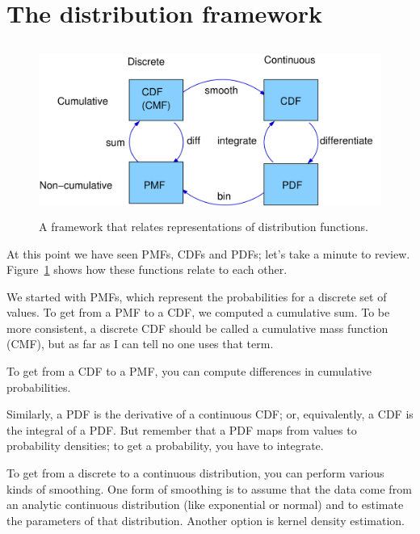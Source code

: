 \documentclass[12pt]{book}
\begin{document}
\section{The distribution framework}

\begin{figure}
\centerline{\includegraphics[height=2.2in]{figs/distribution_functions.pdf}}
\caption{A framework that relates representations of distribution
functions.}
\label{dist_framework}
\end{figure}

At this point we have seen PMFs, CDFs and PDFs; let's take a minute
to review.  Figure~\ref{dist_framework} shows how these functions relate
to each other.

We started with PMFs, which represent the probabilities for a discrete
set of values.  To get from a PMF to a CDF, we computed a cumulative sum.
To be more consistent, a discrete CDF should be called a cumulative mass
function (CMF), but as far as I can tell no one uses that term.

To get from a CDF to a PMF, you can compute differences in cumulative
probabilities.

Similarly, a PDF is the derivative of a continuous CDF; or, equivalently,
a CDF is the integral of a PDF.  But remember that a PDF maps from
values to probability densities; to get a probability, you have to
integrate.

To get from a discrete to a continuous distribution, you can perform
various kinds of smoothing.  One form of smoothing is to assume that
the data come from an analytic continuous distribution
(like exponential or normal) and to estimate the parameters of that
distribution.  Another option is kernel density estimation.
\end{document}
